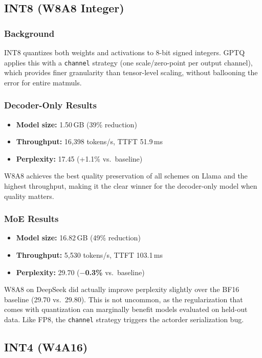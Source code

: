 \documentclass[10pt,twocolumn]{article}
\begin{document}
\subsection{INT8 (W8A8 Integer)}
\subsubsection{Background}
INT8 quantizes both weights and activations to 8-bit signed integers. GPTQ applies this with a \texttt{channel} strategy (one scale/zero-point per output channel), which provides finer granularity than tensor-level scaling, without ballooning the error for entire matmuls.

\subsubsection{Decoder-Only Results}
\begin{itemize}
  \item \textbf{Model size:} 1.50\,GB (39\% reduction)
  \item \textbf{Throughput:} 16{,}398 tokens/s, TTFT 51.9\,ms
  \item \textbf{Perplexity:} 17.45 (+1.1\% vs.\ baseline)
\end{itemize}
W8A8 achieves the best quality preservation of all schemes on Llama and the highest throughput, making it the clear winner for the decoder-only model when quality matters.

\subsubsection{MoE Results}
\begin{itemize}
  \item \textbf{Model size:} 16.82\,GB (49\% reduction)
  \item \textbf{Throughput:} 5{,}530 tokens/s, TTFT 103.1\,ms
  \item \textbf{Perplexity:} 29.70 (\textbf{$-$0.3\%} vs.\ baseline)
\end{itemize}
W8A8 on DeepSeek did actually improve perplexity slightly over the BF16 baseline (29.70 vs.\ 29.80). This is not uncommon, as the regularization that comes with quantization can marginally benefit models evaluated on held-out data. Like FP8, the \texttt{channel} strategy triggers the actorder serialization bug.

\subsection{INT4 (W4A16)}
\end{document}

